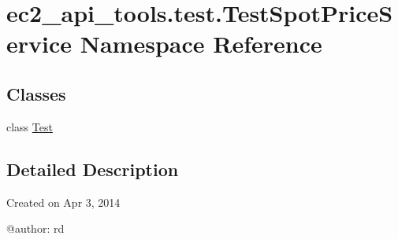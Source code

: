 \hypertarget{namespaceec2__api__tools_1_1test_1_1TestSpotPriceService}{\section{ec2\-\_\-api\-\_\-tools.\-test.\-Test\-Spot\-Price\-Service Namespace Reference}
\label{namespaceec2__api__tools_1_1test_1_1TestSpotPriceService}
}
\subsection*{Classes}
\begin{DoxyCompactItemize}
\item 
class \hyperlink{classec2__api__tools_1_1test_1_1TestSpotPriceService_1_1Test}{Test}
\end{DoxyCompactItemize}


\subsection{Detailed Description}
\begin{DoxyVerb}Created on Apr 3, 2014

@author: rd
\end{DoxyVerb}
 